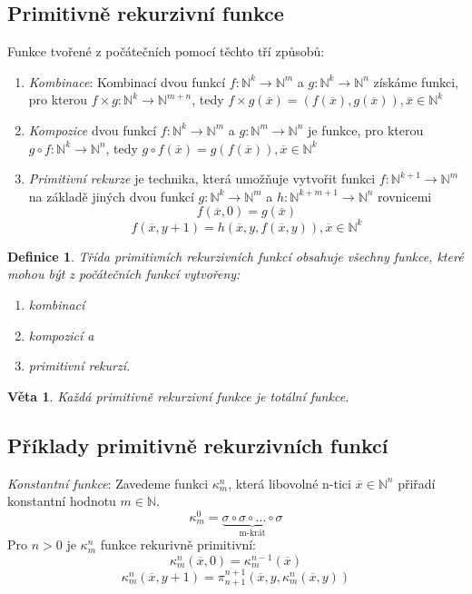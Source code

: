 \documentclass[a4paper, 11pt]{report}
\newtheorem{mydef}{Definice}[chapter]
\newtheorem{veta}{Věta}[chapter]
\begin{document}
\subsection{Primitivně rekurzivní funkce}
Funkce tvořené z počátečních pomocí těchto tří způsobů:
\begin{enumerate}
	\item \emph{Kombinace}: Kombinací dvou funkcí $f: \mathbb{N}^k \to \mathbb{N}^m$ a $g: \mathbb{N}^k \to \mathbb{N}^n$ získáme funkci, pro kterou
	$f \times g: \mathbb{N}^k \to \mathbb{N}^{m+n}$, tedy $f \times g(\overline{x}) = (f(\overline{x}), g(\overline{x})), \overline{x} \in \mathbb{N}^k$
	\item \emph{Kompozice} dvou funkcí $f: \mathbb{N}^k \to \mathbb{N}^m$ a $g: \mathbb{N}^m \to \mathbb{N}^n$ je funkce, pro kterou
	$g \circ f : \mathbb{N}^k \to \mathbb{N}^n$, tedy $g \circ f(\overline{x}) = g(f(\overline{x})), \overline{x} \in \mathbb{N}^k$
	\item \emph{Primitivní rekurze} je technika, která umožňuje vytvořit funkci $f: \mathbb{N}^{k+1} \to \mathbb{N}^m$ na základě jiných dvou funkcí $g: \mathbb{N}^k \to \mathbb{N}^m$ a $h: \mathbb{N}^{k+m+1} \to \mathbb{N}^n$ rovnicemi
	$$f(\overline{x}, 0) = g(\overline{x})$$
	$$f(\overline{x}, y+1) = h(\overline{x}, y, f(\overline{x}, y)), \overline{x} \in \mathbb{N}^k$$
\end{enumerate}

\begin{mydef}
Třída primitivních rekurzivních funkcí obsahuje všechny funkce, které mohou být z počátečních funkcí vytvořeny:
\begin{enumerate}
	\item kombinací
	\item kompozicí a 
	\item primitivní rekurzí.
\end{enumerate}
\end{mydef}

\begin{veta}
Každá primitivně rekurzivní funkce je totální funkce.
\end{veta}

\subsection{Příklady primitivně rekurzivních funkcí}

\emph{Konstantní funkce}: Zavedeme funkci $\kappa_m^n$, která libovolné n-tici $\overline{x} \in \mathbb{N}^n$ přiřadí konstantní hodnotu $m \in \mathbb{N}$.
$$\kappa_m^0 = \underbrace{\sigma \circ \sigma \circ \dots \circ \sigma}_\text{m-krát}$$
Pro $n > 0$ je $\kappa_m^n$ funkce rekurivně primitivní:
$$\kappa_m^n(\overline{x}, 0) = \kappa_m^{n-1}(\overline{x})$$
$$\kappa_m^n(\overline{x}, y+1) = \pi_{n+1}^{n+1}(\overline{x}, y, \kappa_m^n(\overline{x}, y))$$
\end{document}
